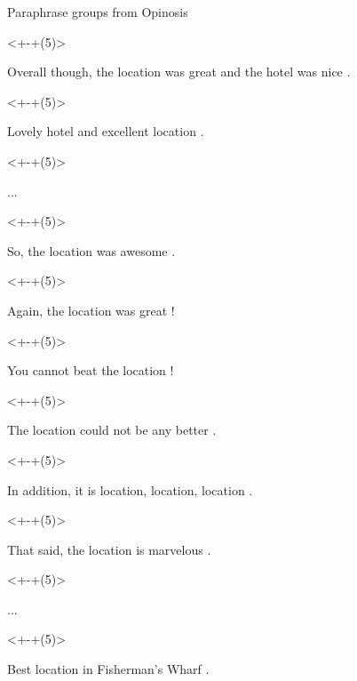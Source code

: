 \documentclass[12pt,landscape,english]{beamer}
\begin{document}
\begin{frame}[fragile]{Paraphrase groups from Opinosis}
	\begin{itemize}
	   	\only<+-+(5)>{\item Overall though, the location was great and the hotel was nice .}
	   	\only<+-+(5)>{\item Lovely hotel and excellent location .}
	   	\only<+-+(5)>{\item ...}
	   	\only<+-+(5)>{\item So, the location was awesome .}
	   	\only<+-+(5)>{\item Again, the location was great !}
	   	\only<+-+(5)>{\item You cannot beat the location !}
	   	\only<+-+(5)>{\item The location could not be any better .}
	   	\only<+-+(5)>{\item In addition, it is location, location, location .}
	   	\only<+-+(5)>{\item That said, the location is marvelous .}
	   	\only<+-+(5)>{\item ...}
	   	\only<+-+(5)>{\item Best location in Fisherman's Wharf .}
	   
	\end{itemize}
\end{frame}
\end{document}

